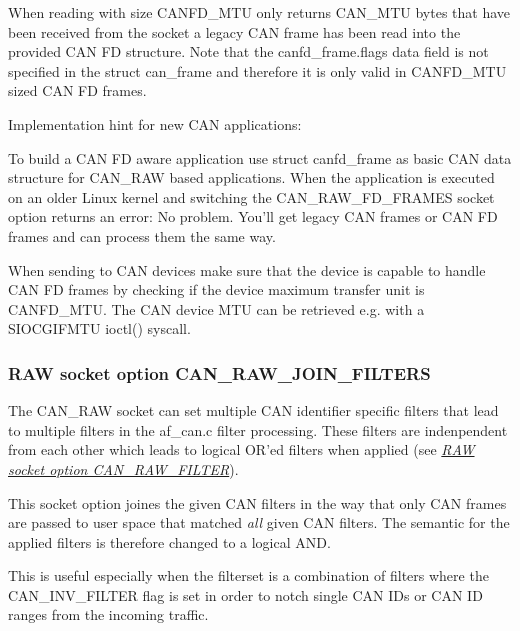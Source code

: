 \documentclass[a4paper,8pt,english]{sphinxmanual}
\begin{document}
When reading with size CANFD\_MTU only returns CAN\_MTU bytes that have
been received from the socket a legacy CAN frame has been read into the
provided CAN FD structure. Note that the canfd\_frame.flags data field is
not specified in the struct can\_frame and therefore it is only valid in
CANFD\_MTU sized CAN FD frames.

Implementation hint for new CAN applications:

To build a CAN FD aware application use struct canfd\_frame as basic CAN
data structure for CAN\_RAW based applications. When the application is
executed on an older Linux kernel and switching the CAN\_RAW\_FD\_FRAMES
socket option returns an error: No problem. You'll get legacy CAN frames
or CAN FD frames and can process them the same way.

When sending to CAN devices make sure that the device is capable to handle
CAN FD frames by checking if the device maximum transfer unit is CANFD\_MTU.
The CAN device MTU can be retrieved e.g. with a SIOCGIFMTU ioctl() syscall.


\subsubsection{RAW socket option CAN\_RAW\_JOIN\_FILTERS}
\label{networking/can:raw-socket-option-can-raw-join-filters}
The CAN\_RAW socket can set multiple CAN identifier specific filters that
lead to multiple filters in the af\_can.c filter processing. These filters
are indenpendent from each other which leads to logical OR'ed filters when
applied (see {\hyperref[networking/can:socketcan\string-rawfilter]{\emph{RAW socket option CAN\_RAW\_FILTER}}}).

This socket option joines the given CAN filters in the way that only CAN
frames are passed to user space that matched \emph{all} given CAN filters. The
semantic for the applied filters is therefore changed to a logical AND.

This is useful especially when the filterset is a combination of filters
where the CAN\_INV\_FILTER flag is set in order to notch single CAN IDs or
CAN ID ranges from the incoming traffic.
\end{document}
